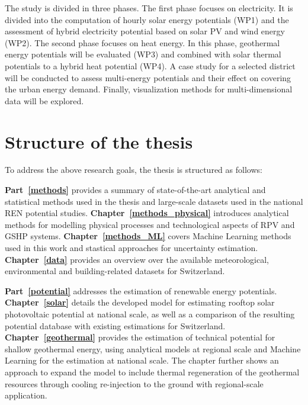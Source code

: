 The study is divided in three phases. The first phase focuses on electricity. It is divided into the computation of hourly solar energy potentials (WP1) and the assessment of hybrid electricity potential based on solar PV and wind energy (WP2). The second phase focuses on heat energy. In this phase, geothermal energy potentials will be evaluated (WP3) and combined with solar thermal potentials to a hybrid heat potential (WP4). A case study for a selected district will be conducted to assess multi-energy potentials and their effect on covering the urban energy demand. Finally, visualization methods for multi-dimensional data will be explored. 


\section{Structure of the thesis}
To address the above research goals, the thesis is structured as follows:

\textbf{Part~\ref{methods}} provides a summary of state-of-the-art analytical and statistical methods used in the thesis and large-scale datasets used in the national REN potential studies. \textbf{Chapter~\ref{methods_physical}} introduces analytical methods for modelling physical processes and technological aspects of RPV and GSHP systems. \textbf{Chapter~\ref{methods_ML}} covers Machine Learning methods used in this work and stastical approaches for uncertainty estimation.  \textbf{Chapter~\ref{data}} provides an overview over the available meteorological, environmental and building-related datasets for Switzerland.

\textbf{Part~\ref{potential} }addresses the estimation of renewable energy potentials. \textbf{Chapter~\ref{solar} } details the developed model for estimating rooftop solar photovoltaic potential at national scale, as well as a  comparison of the resulting potential database with existing estimations for Switzerland. \textbf{Chapter~\ref{geothermal}} provides the estimation of technical potential for shallow geothermal energy, using analytical models at regional scale and Machine Learning for the estimation at national scale. The chapter further shows an approach to expand the model to include thermal regeneration of the geothermal resources through cooling re-injection to the ground with regional-scale application.

